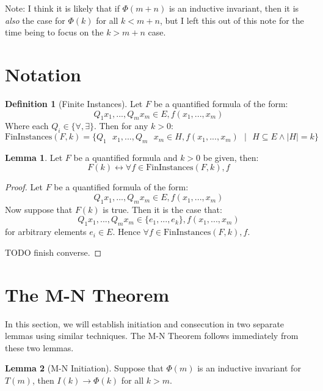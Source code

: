 \documentclass[12pt]{article}
\theoremstyle{definition}
\newtheorem{lemma}{Lemma}
\newtheorem{definition}{Definition}
\theoremstyle{remark}
\newcommand{\msp}{\text{ }}
\newcommand{\st}{\text{ }|\text{ }}
\newcommand{\fininstances}{\text{FinInstances}}
\begin{document}
Note: I think it is likely that if $\Phi(m+n)$ is an inductive invariant, then it is \textit{also} the case for $\Phi(k)$ for all $k<m+n$, but I left this out of this note for the time being to focus on the $k>m+n$ case.



\section{Notation}
\begin{definition}[Finite Instances]
  Let $F$ be a quantified formula of the form:
  $$Q_1 x_1,...,Q_m x_m \in E, f(x_1,...,x_m)$$
  Where each $Q_i \in \{\forall,\exists\}$.  Then for any $k>0$:
  $$\fininstances(F,k) = \{Q_1 \msp x_1,...,Q_m \msp x_m \in H, f(x_1,...,x_m) \st H \subseteq E \land |H|=k\}$$
\end{definition}

\begin{lemma}
  Let $F$ be a quantified formula and $k>0$ be given, then:
  $$F(k) \leftrightarrow \forall f \in \fininstances(F,k), f$$
\end{lemma}
\begin{proof}
  Let $F$ be a quantified formula of the form:
  $$Q_1 x_1,...,Q_m x_m \in E, f(x_1,...,x_m)$$
  Now suppose that $F(k)$ is true.  Then it is the case that:
  $$Q_1 x_1,...,Q_m x_m \in \{e_1,...,e_k\}, f(x_1,...,x_m)$$
  for arbitrary elements $e_i \in E$.  Hence $\forall f \in \fininstances(F,k), f$.

  TODO finish converse.
\end{proof}



\section{The M-N Theorem}

In this section, we will establish initiation and consecution in two separate lemmas using similar techniques.  The M-N Theorem follows immediately from these two lemmas.

\begin{lemma}[M-N Initiation]
  Suppose that $\Phi(m)$ is an inductive invariant for $T(m)$, then $I(k) \rightarrow \Phi(k)$ for all $k>m$.
\end{lemma}
\end{document}
